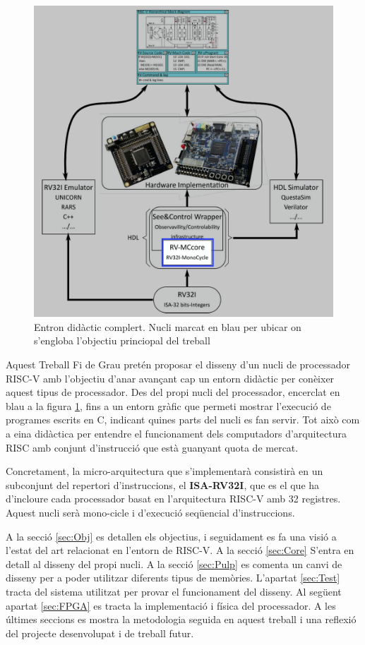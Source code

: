 \documentclass[10pt,a4paper,twocolumn,twoside]{article}
\begin{document}
    \begin{figure}[!ht]
    \centering
    	\includegraphics[width=\linewidth]{img/core_stack.png}
        \caption{Entron didàctic complert. Nucli marcat en blau per ubicar on s'engloba l'objectiu princiopal del treball}
        \label{fig:core_stack}
    \end{figure}

Aquest Treball Fi de Grau pretén proposar el disseny d'un nucli de processador RISC-V amb l’objectiu d’anar avançant cap un entorn didàctic per conèixer aquest tipus de processador. Des del propi nucli del processador, encerclat en blau a la figura \ref{fig:core_stack}, fins a un entorn gràfic que permeti mostrar l'execució de programes escrits en C, indicant quines parts del nucli es fan servir.
Tot això com a eina didàctica per entendre el funcionament dels computadors d'arquitectura RISC amb conjunt d'instrucció que està guanyant quota de mercat. 

Concretament, la micro-arquitectura que s'implementarà consistirà en un subconjunt del repertori d’instruccions, el \textbf{ISA-RV32I}, que es el que ha d'incloure cada processador basat en l'arquitectura RISC-V amb 32 registres. 
Aquest nucli serà mono-cicle i d’execució seqüencial d’instruccions. 

A la secció \ref{sec:Obj} es detallen els objectius, i seguidament es fa una visió a l'estat del art relacionat en l'entorn de RISC-V. A la secció \ref{sec:Core} S'entra en detall al disseny del propi nucli. A la secció \ref{sec:Pulp} es comenta un canvi de disseny per a poder utilitzar diferents tipus de memòries. L'apartat \ref{sec:Test} tracta del sistema utilitzat per provar el funcionament del disseny. Al següent apartat \ref{sec:FPGA} es tracta la implementació i física del processador. A les últimes seccions es mostra la metodologia seguida en aquest treball i una reflexió del projecte desenvolupat i de treball futur.
\end{document}

